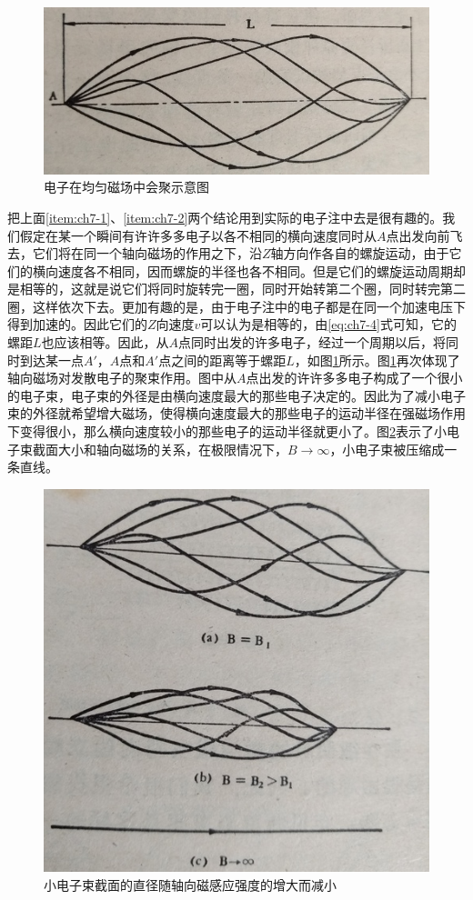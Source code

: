 \begin{figure}[phtb]
	\centering
	\includegraphics[width=0.6\linewidth]{figure/ch7-4}
	\caption{电子在均匀磁场中会聚示意图}
	\label{ch7-4}
\end{figure}

把上面\ref{item:ch7-1}、\ref{item:ch7-2}两个结论用到实际的电子注中去是很有趣的。我们假定在某一个瞬间有许许多多电子以各不相同的横向速度同时从$ A $点出发向前飞去，它们将在同一个轴向磁场的作用之下，沿$ Z $轴方向作各自的螺旋运动，由于它们的横向速度各不相同，因而螺旋的半径也各不相同。但是它们的螺旋运动周期却是相等的，这就是说它们将同时旋转完一圈，同时开始转第二个圈，同时转完第二圈，这样依次下去。更加有趣的是，由于电子注中的电子都是在同一个加速电压下得到加速的。因此它们的$ Z $向速度$ v $可以认为是相等的，由\ref{eq:ch7-4}式可知，它的螺距$ L $也应该相等。因此，从$ A $点同时出发的许多电子，经过一个周期以后，将同时到达某一点$ A' $，$ A $点和$ A' $点之间的距离等于螺距$ L $，如图\ref{ch7-4}所示。图\ref{ch7-4}再次体现了轴向磁场对发散电子的聚束作用。图中从$ A $点出发的许许多多电子构成了一个很小的电子束，电子束的外径是由横向速度最大的那些电子决定的。因此为了减小电子束的外径就希望增大磁场，使得横向速度最大的那些电子的运动半径在强磁场作用下变得很小，那么横向速度较小的那些电子的运动半径就更小了。图\ref{ch7-5}表示了小电子束截面大小和轴向磁场的关系，在极限情况下，$ B \to \infty $，小电子束被压缩成一条直线。

\begin{figure}[phtb]
	\centering
	\includegraphics[width=0.55\linewidth]{figure/ch7-5}
	\caption{小电子束截面的直径随轴向磁感应强度的增大而减小}
	\label{ch7-5}
\end{figure}

